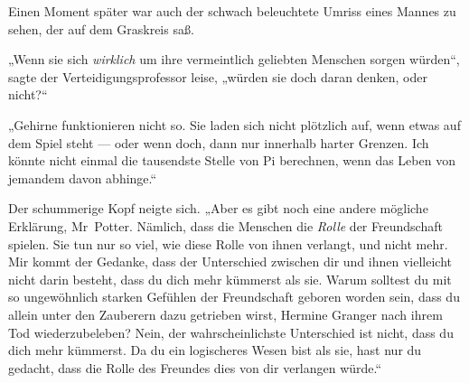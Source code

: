 Einen Moment später war auch der schwach beleuchtete Umriss eines Mannes zu sehen, der auf dem Graskreis saß.

„Wenn sie sich \emph{wirklich} um ihre vermeintlich geliebten Menschen sorgen würden“, sagte der Verteidigungsprofessor leise, „würden sie doch daran denken, oder nicht?“

„Gehirne funktionieren nicht so. Sie laden sich nicht plötzlich auf, wenn etwas auf dem Spiel steht — oder wenn doch, dann nur innerhalb harter Grenzen. Ich könnte nicht einmal die tausendste Stelle von Pi berechnen, wenn das Leben von jemandem davon abhinge.“

Der schummerige Kopf neigte sich.
„Aber es gibt noch eine andere mögliche Erklärung, Mr~Potter. Nämlich, dass die Menschen die \emph{Rolle} der Freundschaft spielen. Sie tun nur so viel, wie diese Rolle von ihnen verlangt, und nicht mehr. Mir kommt der Gedanke, dass der Unterschied zwischen dir und ihnen vielleicht nicht darin besteht, dass du dich mehr kümmerst als sie. Warum solltest du mit so ungewöhnlich starken Gefühlen der Freundschaft geboren worden sein, dass du allein unter den Zauberern dazu getrieben wirst, Hermine Granger nach ihrem Tod wiederzubeleben? Nein, der wahrscheinlichste Unterschied ist nicht, dass du dich mehr kümmerst. Da du ein logischeres Wesen bist als sie, hast nur du gedacht, dass die Rolle des Freundes dies von dir verlangen würde.“

